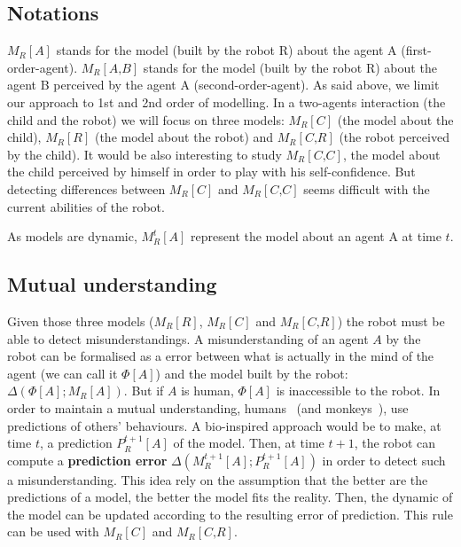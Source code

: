 \documentclass[10pt,a4paper]{article}
\begin{document}
\subsection{Notations}\label{not}
$M_R\left[\textit{A}\right]$ stands for \textcolor{wine}{the model (built by the robot R) about the agent A} (first-order-agent). $M_R\left[\textit{A,B}\right]$ stands for \textcolor{wine}{the model (built by the robot R) about the agent B perceived by the agent A} (second-order-agent). 
As said above, we limit our approach to 1st and 2nd order of modelling. In a two-agents interaction (the child and the robot) we will focus on three models: $ M_R\left[\textit{C}\right]$ (the model about the child), $ M_R\left[\textit{R}\right]$ (the model about the robot) and $ M_R\left[\textit{C,R}\right]$ (the robot perceived by the child). 
It would be also interesting to study $ M_R\left[\textit{C,C}\right]$, the model about the child perceived by himself in order to play with his self-confidence. But detecting differences between $ M_R\left[\textit{C}\right]$ and $ M_R\left[\textit{C,C}\right]$ seems difficult with the current abilities of the robot. 

As models are dynamic, $ M^t_R\left[\textit{A}\right]$ represent the model about an agent A at time $t$.

\subsection{Mutual understanding}
Given those three models ($ M_R\left[\textit{R}\right]$, $ M_R\left[\textit{C}\right]$ and $ M_R\left[\textit{C,R}\right]$) the robot must be able to detect misunderstandings. 
A misunderstanding of an agent $A$ by the robot can be formalised as a error between what is actually in the mind of the agent (we can call it $\Phi[A]$) and the model built by the robot: $\Delta \left(\Phi[A] ; M_R\left[\textit{A}\right]\right)$. But if $A$ is human, $\Phi[A]$ is inaccessible to the robot. In order to maintain a mutual understanding, humans~\cite{suzuki2015neural} (and monkeys~\cite{haroush2015neuronal}), use predictions of others' behaviours. A bio-inspired approach would be to make, at time $t$, a prediction $P^{t+1}_R\left[\textit{A}\right]$ of the model. Then, at time $t+1$, the robot can compute a \textbf{prediction error} $\Delta \left( M^{t+1}_R\left[\textit{A}\right]; P^{t+1}_R\left[\textit{A}\right]\right)$ in order to detect such a misunderstanding. This idea rely on the assumption that the better are the predictions of a model, the better the model fits the reality. Then, the dynamic of the model can be updated according to the resulting error of prediction. This rule can be used with $ M_R\left[\textit{C}\right]$ and $ M_R\left[\textit{C,R}\right]$. 
\end{document}

